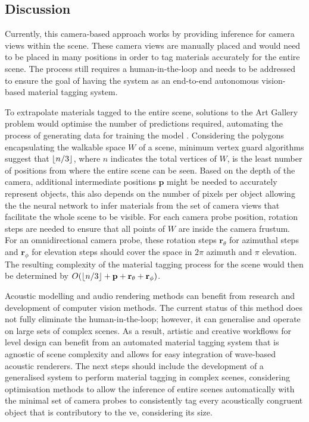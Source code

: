 

\subsection{Discussion}
Currently, this camera-based approach works by providing inference for camera views within the scene. These camera views are manually placed and would need to be placed in many positions in order to tag materials accurately for the entire scene. The process still requires a human-in-the-loop and needs to be addressed to ensure the goal of having the system as an end-to-end autonomous vision-based material tagging system.\par
To extrapolate materials tagged to the entire scene, solutions to the Art Gallery problem would optimise the number of predictions required, automating the process of generating data for training the model \cite{devadoss2011discrete, bajuelos2008optimizing}. Considering the polygons encapsulating the walkable space $W$ of a scene, minimum vertex guard algorithms suggest that $\floor*{n/3}$, where $n$ indicates the total vertices of $W$, is the least number of positions from where the entire scene can be seen. Based on the depth of the camera, additional intermediate positions $\textbf{p}$ might be needed to accurately represent objects, this also depends on the number of pixels per object allowing the the neural network to infer materials from the set of camera views that facilitate the whole scene to be visible. For each camera probe position, rotation steps are needed to ensure that all points of $W$ are inside the camera frustum. For an omnidirectional camera probe, these rotation steps $\textbf{r}_\theta$ for azimuthal steps and $\textbf{r}_\phi$ for elevation steps should cover the space in $2\pi$ azimuth and $\pi$ elevation. The resulting complexity of the material tagging process for the scene would then be determined by $O(\floor*{n/3} + \textbf{p} + \textbf{r}_\theta + \textbf{r}_\phi)$.\par
Acoustic modelling and audio rendering methods can benefit from research and development of computer vision methods. The current status of this method does not fully eliminate the human-in-the-loop; however, it can generalise and operate on large sets of complex scenes. As a result, artistic and creative workflows for level design can benefit from an automated material tagging system that is agnostic of scene complexity and allows for easy integration of wave-based acoustic renderers. The next steps should include the development of a generalised system to perform material tagging in complex scenes, considering optimisation methods to allow the inference of entire scenes automatically with the minimal set of camera probes to consistently tag every acoustically congruent object that is contributory to the \acrshort{ve}, considering its size.\par
